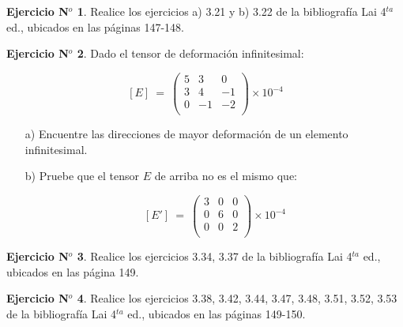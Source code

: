 \documentclass[11pt,a4paper]{article}
\theoremstyle{definition}
\newtheorem{theorem}{Ejercicio N$^o$}
\begin{document}
\medskip

\begin{theorem}

Realice los ejercicios a) 3.21 y b) 3.22 de la bibliografía Lai 4$^{ta}$ ed., ubicados en las páginas 147-148.

\end{theorem}

\medskip


\begin{theorem}
Dado el tensor de deformación infinitesimal:

\[
[E] \: = \: \left( \begin{array}{ccc}

5 & 3 & 0 \\
3 & 4 & -1 \\
0 & -1 & -2 \\

\end{array} \right)  
\times 10^{-4}
\] 

\begin{itemize}
\item[a)] Encuentre las direcciones de mayor deformación de un elemento infinitesimal.
\item[b)] Pruebe que el tensor $E$ de arriba no es el mismo que:

\[
[E'] \: = \: \left( \begin{array}{ccc}

3 & 0 & 0 \\
0 & 6 & 0 \\
0 & 0 & 2 \\

\end{array} \right)  
\times 10^{-4}
\] 


\end{itemize}

\end{theorem}


\medskip

\begin{theorem}
Realice los ejercicios 3.34, 3.37 de la bibliografía Lai 4$^{ta}$ ed., ubicados en las página 149.
\end{theorem}

\medskip

\begin{theorem}
Realice los ejercicios 3.38, 3.42, 3.44, 3.47, 3.48, 3.51, 3.52, 3.53 de la bibliografía Lai 4$^{ta}$ ed., ubicados en las páginas 149-150.
\end{theorem}
\end{document}
